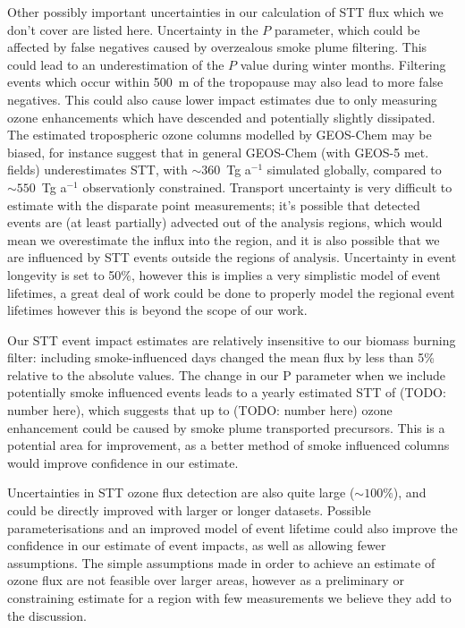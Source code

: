 \documentclass[acp, manuscript]{copernicus} %
\begin{document}
    Other possibly important uncertainties in our calculation of STT flux which we don't cover are listed here.
    Uncertainty in the $P$ parameter, which could be affected by false negatives caused by overzealous smoke plume filtering.
    This could lead to an underestimation of the $P$ value during winter months.
    Filtering events which occur within 500~m of the tropopause may also lead to more false negatives.
    This could also cause lower impact estimates due to only measuring ozone enhancements which have descended and potentially slightly dissipated.
    The estimated tropospheric ozone columns modelled by GEOS-Chem may be biased, for instance \cite{Hu2017} suggest that in general GEOS-Chem (with GEOS-5 met. fields) underestimates STT, with $\sim 360$~Tg a$^{-1}$ simulated globally, compared to $\sim 550$~Tg a$^{-1}$ observationly constrained.
    Transport uncertainty is very difficult to estimate with the disparate point measurements; it's possible that detected events are (at least partially) advected out of the analysis regions, which would mean we overestimate the influx into the region, and it is also possible that we are influenced by STT events outside the regions of analysis.
    Uncertainty in event longevity is set to 50\%, however this is implies a very simplistic model of event lifetimes, a great deal of work could be done to properly model the regional event lifetimes however this is beyond the scope of our work.
    
    Our STT event impact estimates are relatively insensitive to our biomass burning filter: including smoke-influenced days changed the mean flux by less than 5\% relative to the absolute values.
    The change in our P parameter when we include potentially smoke influenced events leads to a yearly estimated STT of (TODO: number here), which suggests that up to (TODO: number here) ozone enhancement could be caused by smoke plume transported precursors.
    This is a potential area for improvement, as a better method of smoke influenced columns would improve confidence in our estimate.
  
    Uncertainties in STT ozone flux detection are also quite large ($\sim 100\%$), and could be directly improved with larger or longer datasets.
    Possible parameterisations and an improved model of event lifetime could also improve the confidence in our estimate of event impacts, as well as allowing fewer assumptions.
    The simple assumptions made in order to achieve an estimate of ozone flux are not feasible over larger areas, however as a preliminary or constraining estimate for a region with few measurements we believe they add to the discussion.
  
\end{document}
